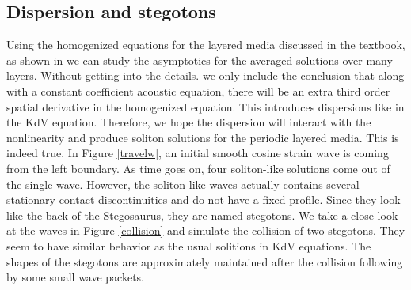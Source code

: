 \documentclass{article}
\begin{document}
\subsection{Dispersion and stegotons}
Using the homogenized equations for the layered media discussed in the textbook, as shown in \cite{leveque2003} we can study the asymptotics for the averaged solutions over many layers. Without getting into the details. we only include the conclusion that along with a constant coefficient acoustic equation, there will be an extra third order spatial derivative in the homogenized equation. This introduces dispersions like in the KdV equation. Therefore, we hope the dispersion will interact with the nonlinearity and produce soliton solutions for the periodic layered media. This is indeed true. In Figure \ref{travelw}, an initial smooth cosine strain wave is coming from the left boundary. As time goes on, four soliton-like solutions come out of the single wave. However, the soliton-like waves actually contains several stationary contact discontinuities and do not have a fixed profile. Since they look like the back of the Stegosaurus, they are named stegotons. We take a close look at the waves in Figure \ref{collision} and simulate the collision of two stegotons. They seem to have similar behavior as the usual solitions in KdV equations. The shapes of the stegotons are approximately maintained after the collision following by some small wave packets.
\end{document}
